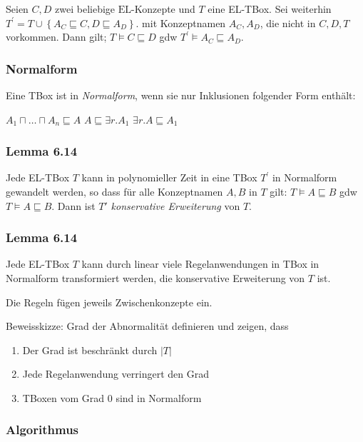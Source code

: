 Seien $C,D$ zwei beliebige $\text{EL}$-Konzepte und $T$ eine
EL-TBox. Sei weiterhin
$T^{'} = T \cup \left\{ A_{C} \sqsubseteq C,D \sqsubseteq A_{D} \right\}$.
mit Konzeptnamen $A_{C},A_{D}$, die nicht in $C,D,T$ vorkommen. Dann
gilt; $T \vDash C \sqsubseteq D$ gdw
$T^{'} \vDash A_{C} \sqsubseteq A_{D}$.

\subsubsection{ Normalform}\label{normalform}

Eine TBox ist in \emph{Normalform}, wenn sie nur Inklusionen folgender
Form enthält:

$A_{1} \sqcap \ldots \sqcap A_{n} \sqsubseteq A$
$A \sqsubseteq \exists r.A_{1}$ $\exists r.A \sqsubseteq A_{1}$

\subsubsection{Lemma 6.14}\label{lemma-6.14}

Jede EL-TBox $T$ kann in polynomieller Zeit in eine TBox $T^{'}$ in
Normalform gewandelt werden, so dass für alle Konzeptnamen $A,B$ in
$T$ gilt: $T \vDash A \sqsubseteq B$ gdw
$T \vDash A \sqsubseteq B$. Dann ist $T'$ \emph{konservative
Erweiterung} von $T$.

\subsubsection{Lemma 6.14}\label{lemma-6.14-1}

Jede EL-TBox $T$ kann durch linear viele Regelanwendungen in TBox in
Normalform transformiert werden, die konservative Erweiterung von $T$
ist.

Die Regeln fügen jeweils Zwischenkonzepte ein.

Beweisskizze: Grad der Abnormalität definieren und zeigen, dass

\begin{enumerate}
\def\labelenumi{\arabic{enumi}.}
\item
  Der Grad ist beschränkt durch $\left| T \right|$
\item
  Jede Regelanwendung verringert den Grad
\item
  TBoxen vom Grad $0$ sind in Normalform
\end{enumerate}

\subsubsection{Algorithmus}\label{algorithmus}

